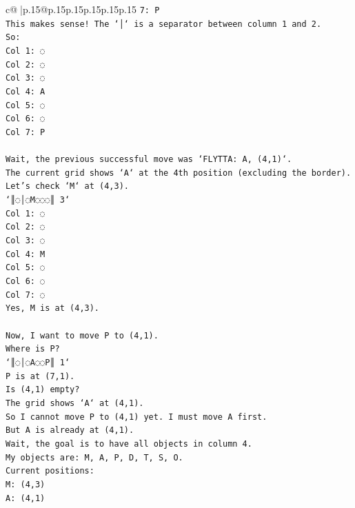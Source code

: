 \documentclass{article}
\begin{document}
{\begin{supertabular}{c@{$\;$}|p{.15\linewidth}@{}p{.15\linewidth}p{.15\linewidth}p{.15\linewidth}p{.15\linewidth}p{.15\linewidth}}
{{{\texttt{7: P} \\
\texttt{This makes sense! The `│` is a separator between column 1 and 2.} \\
\texttt{So:} \\
\texttt{Col 1: ◌} \\
\texttt{Col 2: ◌} \\
\texttt{Col 3: ◌} \\
\texttt{Col 4: A} \\
\texttt{Col 5: ◌} \\
\texttt{Col 6: ◌} \\
\texttt{Col 7: P} \\
\\ 
\texttt{Wait, the previous successful move was `FLYTTA: A, (4,1)`.} \\
\texttt{The current grid shows `A` at the 4th position (excluding the border).} \\
\texttt{Let's check `M` at (4,3).} \\
\texttt{`║◌│◌M◌◌◌║ 3`} \\
\texttt{Col 1: ◌} \\
\texttt{Col 2: ◌} \\
\texttt{Col 3: ◌} \\
\texttt{Col 4: M} \\
\texttt{Col 5: ◌} \\
\texttt{Col 6: ◌} \\
\texttt{Col 7: ◌} \\
\texttt{Yes, M is at (4,3).} \\
\\ 
\texttt{Now, I want to move P to (4,1).} \\
\texttt{Where is P?} \\
\texttt{`║◌│◌A◌◌P║ 1`} \\
\texttt{P is at (7,1).} \\
\texttt{Is (4,1) empty?} \\
\texttt{The grid shows `A` at (4,1).} \\
\texttt{So I cannot move P to (4,1) yet. I must move A first.} \\
\texttt{But A is already at (4,1).} \\
\texttt{Wait, the goal is to have all objects in column 4.} \\
\texttt{My objects are: M, A, P, D, T, S, O.} \\
\texttt{Current positions:} \\
\texttt{M: (4,3)} \\
\texttt{A: (4,1)} \\
}}}
\end{supertabular}}
\end{document}
